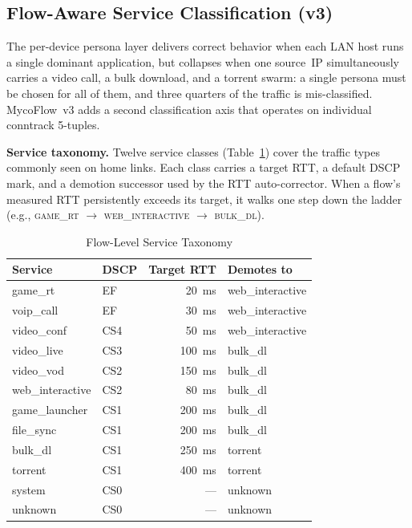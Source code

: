 \documentclass[conference]{IEEEtran}
\begin{document}
\subsection{Flow-Aware Service Classification (v3)}
\label{subsec:flowaware}

The per-device persona layer delivers correct behavior when each LAN host
runs a single dominant application, but collapses when one source~IP
simultaneously carries a video call, a bulk download, and a torrent
swarm: a single persona must be chosen for all of them, and three
quarters of the traffic is mis-classified.
MycoFlow~v3 adds a second classification axis that operates on individual
conntrack 5-tuples.

\textbf{Service taxonomy.}
Twelve service classes (Table~\ref{tab:services}) cover the traffic
types commonly seen on home links.
Each class carries a target RTT, a default DSCP mark, and a demotion
successor used by the RTT auto-corrector.
When a flow's measured RTT persistently exceeds its target, it walks
one step down the ladder (e.g., \textsc{game\_rt} $\to$
\textsc{web\_interactive} $\to$ \textsc{bulk\_dl}).

\begin{table}[t]
\caption{Flow-Level Service Taxonomy}
\label{tab:services}
\centering
\scriptsize
{\setlength{\tabcolsep}{3pt}
\begin{tabular}{llrl}
\toprule
\textbf{Service} & \textbf{DSCP} & \textbf{Target RTT} & \textbf{Demotes to} \\
\midrule
game\_rt          & EF   & 20~ms  & web\_interactive \\
voip\_call        & EF   & 30~ms  & web\_interactive \\
video\_conf       & CS4  & 50~ms  & web\_interactive \\
video\_live       & CS3  & 100~ms & bulk\_dl \\
video\_vod        & CS2  & 150~ms & bulk\_dl \\
web\_interactive  & CS2  & 80~ms  & bulk\_dl \\
game\_launcher    & CS1  & 200~ms & bulk\_dl \\
file\_sync        & CS1  & 200~ms & bulk\_dl \\
bulk\_dl          & CS1  & 250~ms & torrent \\
torrent           & CS1  & 400~ms & torrent \\
system            & CS0  & ---    & unknown \\
unknown           & CS0  & ---    & unknown \\
\bottomrule
\end{tabular}}
\end{table}
\end{document}
